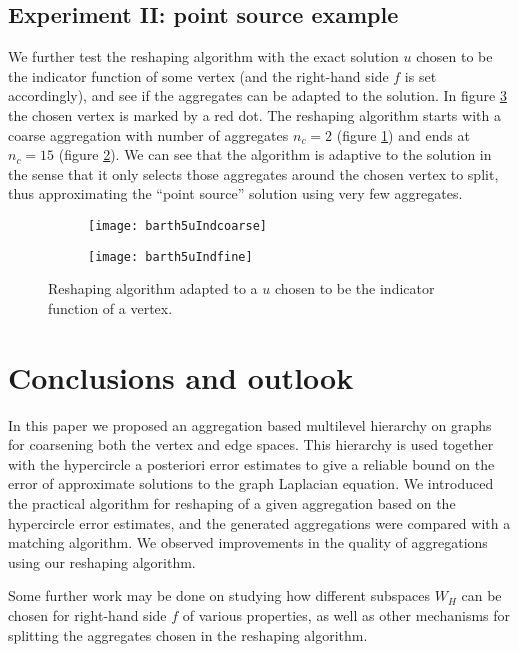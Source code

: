 \documentclass[ ]{elsarticle}
\newcommand{\esp}{W}
\numberwithin{equation}{section}
\begin{document}
\subsection{Experiment II: point source example}
We further test the reshaping algorithm with the exact solution $u$
chosen to be the indicator function of some vertex (and the right-hand
side $f$ is set accordingly), and see if the aggregates can be adapted
to the solution. In figure \ref{fig:reshaping-ind} the chosen vertex
is marked by a red dot. The reshaping algorithm starts with a coarse
aggregation with number of aggregates $n_c=2$ (figure
\ref{fig:reshaping-ind1}) and ends at $n_c=15$ (figure
\ref{fig:reshaping-ind2}). We can see that the algorithm is adaptive
to the solution in the sense that it only selects those aggregates
around the chosen vertex to split, thus approximating the ``point
source'' solution using very few aggregates.

\begin{figure}
  \begin{subfigure}{0.49\textwidth}
    \texttt{[image: barth5uIndcoarse]}
    \caption{}\label{fig:reshaping-ind1}
  \end{subfigure}
  \begin{subfigure}{0.49\textwidth}
    \texttt{[image: barth5uIndfine]}
    \caption{}
    \label{fig:reshaping-ind2}
  \end{subfigure}
  \caption{Reshaping algorithm adapted to a $u$ chosen to be the
    indicator function of a vertex.}
  \label{fig:reshaping-ind}
\end{figure}


\section{Conclusions and outlook}
In this paper we proposed an aggregation based multilevel hierarchy on
graphs for coarsening both the vertex and edge spaces. This hierarchy
is used together with the hypercircle a posteriori error estimates to
give a reliable bound on the error of approximate solutions to the
graph Laplacian equation. We introduced the practical algorithm for
reshaping of a given aggregation based on the hypercircle error
estimates, and the generated aggregations were compared with a
matching algorithm. We observed improvements in the quality of
aggregations using our reshaping algorithm.

Some further work may be done on studying how different subspaces
$\esp_H$ can be chosen for right-hand side $f$ of various properties,
as well as other mechanisms for splitting the aggregates chosen in the
reshaping algorithm.




\end{document}
